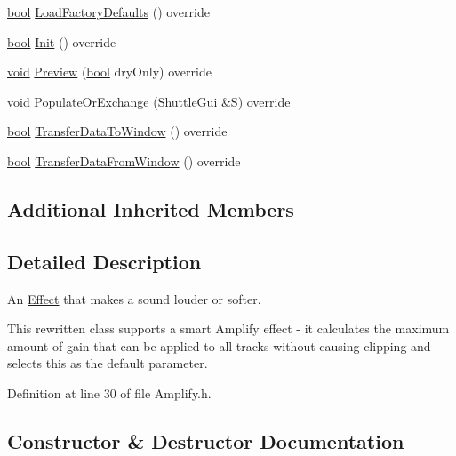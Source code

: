 \begin{DoxyCompactItemize}
\hyperlink{mac_2config_2i386_2lib-src_2libsoxr_2soxr-config_8h_abb452686968e48b67397da5f97445f5b}{bool} \hyperlink{class_effect_amplify_a44cf626aff430782ac589a24b6983517}{Load\+Factory\+Defaults} () override
\item 
\hyperlink{mac_2config_2i386_2lib-src_2libsoxr_2soxr-config_8h_abb452686968e48b67397da5f97445f5b}{bool} \hyperlink{class_effect_amplify_a80136949ba49c906d0525303cde453d2}{Init} () override
\item 
\hyperlink{sound_8c_ae35f5844602719cf66324f4de2a658b3}{void} \hyperlink{class_effect_amplify_a5b9257871e91805337cf33855c9a983e}{Preview} (\hyperlink{mac_2config_2i386_2lib-src_2libsoxr_2soxr-config_8h_abb452686968e48b67397da5f97445f5b}{bool} dry\+Only) override
\item 
\hyperlink{sound_8c_ae35f5844602719cf66324f4de2a658b3}{void} \hyperlink{class_effect_amplify_ab69a5740b2523bf86a1582127be768e8}{Populate\+Or\+Exchange} (\hyperlink{class_shuttle_gui}{Shuttle\+Gui} \&\hyperlink{xlftab_8c_af933676109efed7ab34cea71d748a517}{S}) override
\item 
\hyperlink{mac_2config_2i386_2lib-src_2libsoxr_2soxr-config_8h_abb452686968e48b67397da5f97445f5b}{bool} \hyperlink{class_effect_amplify_a2ef39f1aa4b220f6bbf33f52805b99db}{Transfer\+Data\+To\+Window} () override
\item 
\hyperlink{mac_2config_2i386_2lib-src_2libsoxr_2soxr-config_8h_abb452686968e48b67397da5f97445f5b}{bool} \hyperlink{class_effect_amplify_abc5f1e2349468dc22051808c690540d2}{Transfer\+Data\+From\+Window} () override
\end{DoxyCompactItemize}
\subsection*{Additional Inherited Members}


\subsection{Detailed Description}
An \hyperlink{class_effect}{Effect} that makes a sound louder or softer. 

This rewritten class supports a smart Amplify effect -\/ it calculates the maximum amount of gain that can be applied to all tracks without causing clipping and selects this as the default parameter. 

Definition at line 30 of file Amplify.\+h.



\subsection{Constructor \& Destructor Documentation}
